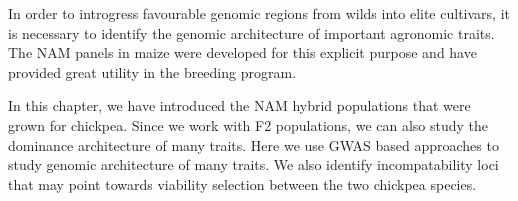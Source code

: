 In order to introgress favourable genomic regions from wilds into elite cultivars, it is necessary to identify the genomic architecture of important agronomic traits. The NAM panels in maize were developed for this explicit purpose and have provided great utility in the breeding program. 

In this chapter, we have introduced the NAM hybrid populations that were grown for chickpea. Since we work with F2 populations, we can also study the dominance architecture of many traits. Here we use GWAS based approaches to study genomic architecture of many traits. We also identify incompatability loci that may point towards viability selection between the two chickpea species. 